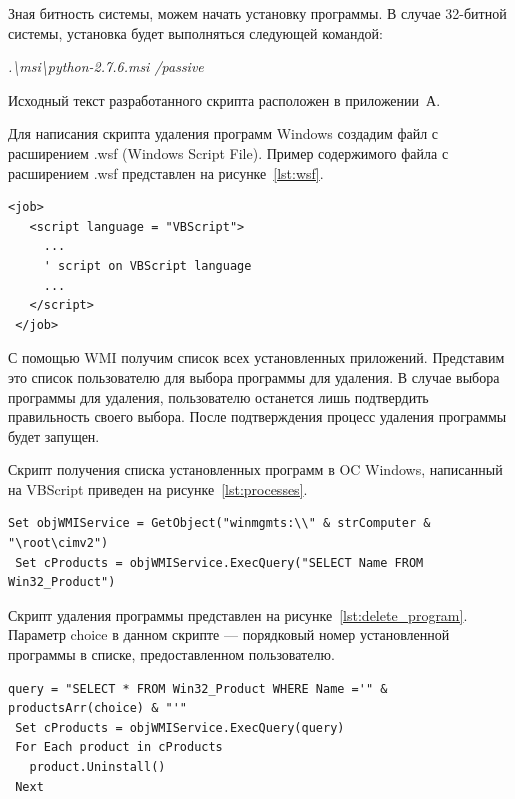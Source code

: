 Зная битность системы, можем начать установку программы. В случае 32-битной
системы, установка будет выполняться следующей командой:

\textit{.\textbackslash msi\textbackslash python-2.7.6.msi /passive}

Исходный текст разработанного скрипта расположен в приложении~А.



Для написания скрипта удаления программ Windows создадим файл
с расширением .wsf (Windows Script File). Пример содержимого файла с расширением
.wsf представлен на рисунке~\ref{lst:wsf}.

\begin{lstlisting}[caption=Пример содержимого файла с расширением .wsf,
label=lst:wsf,basicstyle=\scriptsize\ttfamily,language=VBScript]
 <job>
   <script language = "VBScript">
     ...
     ' script on VBScript language
     ...
   </script>
 </job>
\end{lstlisting}

С помощью WMI получим список всех установленных приложений. Представим это список
пользователю для выбора программы для удаления. В случае выбора программы для
удаления, пользователю останется лишь подтвердить правильность своего выбора.
После подтверждения процесс удаления программы будет запущен.

Скрипт получения списка установленных программ в OC Windows, написанный
на VBScript приведен на рисунке~\ref{lst:processes}.

\begin{lstlisting}[caption=Скрипт получения списка установленных программ \\
на языке VBScript,
label=lst:processes,basicstyle=\scriptsize\ttfamily,language=VBScript]
 Set objWMIService = GetObject("winmgmts:\\" & strComputer & "\root\cimv2")
 Set cProducts = objWMIService.ExecQuery("SELECT Name FROM Win32_Product")
\end{lstlisting}

Скрипт удаления программы представлен на рисунке~\ref{lst:delete_program}.
Параметр choice в данном скрипте --- порядковый номер установленной программы в
списке, предоставленном пользователю.

\begin{lstlisting}[caption=Скрипт удаления выбранной пользователем программы,
label=lst:delete_program,basicstyle=\scriptsize\ttfamily,language=VBScript]
 query = "SELECT * FROM Win32_Product WHERE Name ='" & productsArr(choice) & "'"
 Set cProducts = objWMIService.ExecQuery(query)
 For Each product in cProducts
   product.Uninstall()
 Next
\end{lstlisting}

